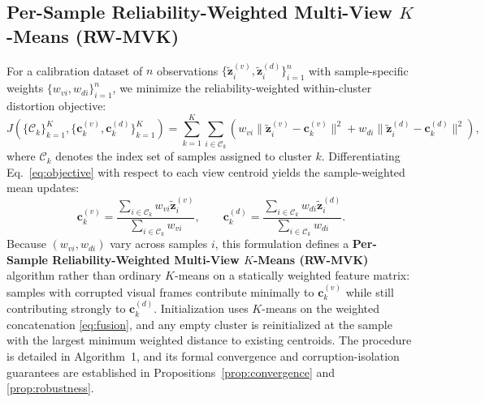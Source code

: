 \documentclass[11pt, a4paper]{article}
\begin{document}
\subsection{Per-Sample Reliability-Weighted Multi-View $K$-Means (RW-MVK)}
\label{subsec:rwkmeans}
For a calibration dataset of $n$ observations $\{\tilde{\mathbf{z}}^{(v)}_i, \tilde{\mathbf{z}}^{(d)}_i\}_{i=1}^n$ with sample-specific weights $\{w_{vi}, w_{di}\}_{i=1}^n$, we minimize the reliability-weighted within-cluster distortion objective:
\begin{equation}
J(\{\mathcal{C}_k\}_{k=1}^K, \{\mathbf{c}^{(v)}_k, \mathbf{c}^{(d)}_k\}_{k=1}^K) = \sum_{k=1}^{K}\sum_{i\in \mathcal{C}_k}
\left(
w_{vi}\|\tilde{\mathbf{z}}^{(v)}_i-\mathbf{c}^{(v)}_k\|^2
+
w_{di}\|\tilde{\mathbf{z}}^{(d)}_i-\mathbf{c}^{(d)}_k\|^2
\right),
\label{eq:objective}
\end{equation}
where $\mathcal{C}_k$ denotes the index set of samples assigned to cluster $k$. Differentiating Eq.~\eqref{eq:objective} with respect to each view centroid yields the sample-weighted mean updates:
\begin{equation}
\mathbf{c}^{(v)}_k =
\frac{\sum_{i\in\mathcal{C}_k} w_{vi}\tilde{\mathbf{z}}^{(v)}_i}
{\sum_{i\in\mathcal{C}_k} w_{vi}},
\qquad
\mathbf{c}^{(d)}_k =
\frac{\sum_{i\in\mathcal{C}_k} w_{di}\tilde{\mathbf{z}}^{(d)}_i}
{\sum_{i\in\mathcal{C}_k} w_{di}}.
\label{eq:centroid}
\end{equation}
Because $(w_{vi}, w_{di})$ vary across samples $i$, this formulation defines a \textbf{Per-Sample Reliability-Weighted Multi-View $K$-Means (RW-MVK)} algorithm rather than ordinary $K$-means on a statically weighted feature matrix: samples with corrupted visual frames contribute minimally to $\mathbf{c}^{(v)}_k$ while still contributing strongly to $\mathbf{c}^{(d)}_k$. Initialization uses $K$-means on the weighted concatenation \eqref{eq:fusion}, and any empty cluster is reinitialized at the sample with the largest minimum weighted distance to existing centroids. The procedure is detailed in Algorithm~1, and its formal convergence and corruption-isolation guarantees are established in Propositions~\ref{prop:convergence} and \ref{prop:robustness}.
\end{document}
